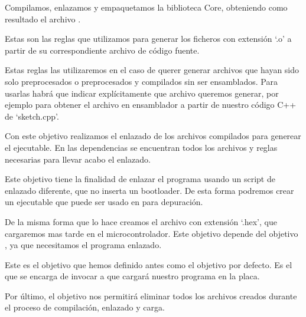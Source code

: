  
 Compilamos, enlazamos y empaquetamos la biblioteca Core, obteniendo como resultado el archivo .
 
 
 Estas son las reglas que utilizamos para generar los ficheros con extensión `.o' a partir de su correspondiente archivo de código fuente.
 
 
 Estas reglas las utilizaremos en el caso de querer generar archivos que hayan sido solo preprocesados o preprocesados y compilados sin ser ensamblados. Para usarlas habrá que indicar explícitamente que archivo queremos generar, por ejemplo  para obtener el archivo en ensamblador a partir de nuestro código C++ de `sketch.cpp'.
 
 
 Con este objetivo realizamos el enlazado de los archivos compilados para generear el ejecutable. En las dependencias se encuentran todos los archivos y reglas necesarias para llevar acabo el enlazado.
 
 
 Este objetivo tiene la finalidad de enlazar el programa usando un script de enlazado diferente, que no inserta un bootloader. De esta forma podremos crear un ejecutable que puede ser usado en  para depuración.
 
 
 De la misma forma que lo hace  creamos el archivo con extensión `.hex', que cargaremos mas tarde en el microcontrolador. Este objetivo depende del objetivo , ya que necesitamos el programa enlazado.
 
 
 Este es el objetivo que hemos definido antes como el objetivo por defecto. Es el que se encarga de invocar a  que cargará nuestro programa en la placa.
 
 
 Por último, el objetivo  nos permitirá eliminar todos los archivos creados durante el proceso de compilación, enlazado y carga.

